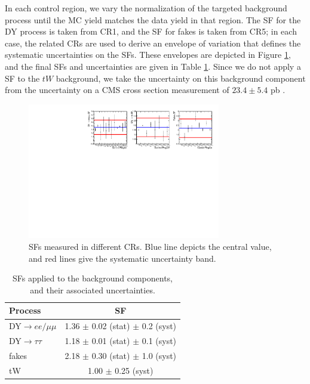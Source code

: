 In each control region, we vary the normalization of the targeted
background process until the MC yield matches the data yield in that
region. The SF for the DY process is taken from CR1, and the SF for
fakes is taken from CR5; in each case, the related CRs are used to
derive an envelope of variation that defines the systematic
uncertainties on the SFs. These envelopes are depicted in Figure
\ref{fig:afb:sfvariations}, and the final SFs and uncertainties are
given in Table \ref{tab:afb:sfs}. Since we do not apply a SF to the
$tW$ background, we take the uncertainty on this background component
from the uncertainty on a CMS cross section measurement of $23.4 \pm
5.4$ pb \cite{twxsec}.

\begin{figure}[t]
  \centering
  \includegraphics[width=0.75\textwidth]{figures/SFs_all.pdf}
  \caption{SFs measured in different CRs. Blue line depicts the
    central value, and red lines give the systematic uncertainty band.}
  \label{fig:afb:sfvariations}
\end{figure}

\begin{table}[h]
\begin{center}
\caption{SFs applied to the background components, and their
  associated uncertainties.}
\label{tab:afb:sfs}
{\small
\begin{tabular}{l|c}
\hline
Process & SF  \\
\hline
DY$\rightarrow ee/\mu\mu$ & 1.36 $\pm$ 0.02 (stat) $\pm$ 0.2 (syst) \\
DY$\rightarrow\tau\tau$   & 1.18 $\pm$ 0.01 (stat) $\pm$ 0.1 (syst) \\
fakes             & 2.18 $\pm$ 0.30 (stat) $\pm$ 1.0 (syst) \\
tW                & 1.00 $\pm$ 0.25 (syst) \\
\hline
\end{tabular}
}
\end{center}
\end{table}

